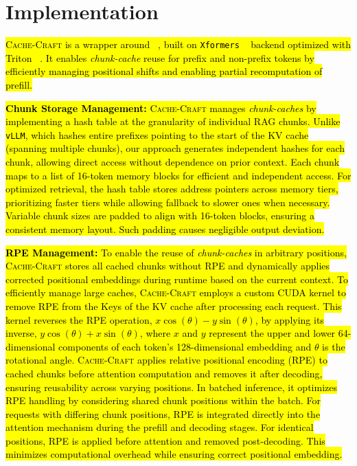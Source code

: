 \section{Implementation}
\label{sec:impl}

\noindent\hl{\textsc{Cache-Craft} is a wrapper around \vllm ~\cite{kwon2023efficient}, built on \texttt{Xformers} ~\cite{xFormers2022} backend optimized with Triton ~\cite{Triton2021}. It enables \textit{chunk-cache} reuse for prefix and non-prefix tokens by efficiently managing positional shifts and enabling partial recomputation of prefill.}


\noindent \hl{\textbf{Chunk Storage Management:} \textsc{Cache-Craft} manages \textit{chunk-caches} by implementing a hash table at the granularity of individual RAG chunks. Unlike \texttt{vLLM}, which hashes entire prefixes pointing to the start of the KV cache (spanning multiple chunks), our approach generates independent hashes for each chunk, allowing direct access without dependence on prior context. Each chunk maps to a list of 16-token memory blocks for efficient and independent access. For optimized retrieval, the hash table stores address pointers across memory tiers, prioritizing faster tiers while allowing fallback to slower ones when necessary. Variable chunk sizes are padded to align with 16-token blocks, ensuring a consistent memory layout. Such padding causes negligible output deviation.}


\noindent \hl{\textbf{RPE Management:} To enable the reuse of \textit{chunk-caches} in arbitrary positions, \textsc{Cache-Craft} stores all cached chunks without RPE and dynamically applies corrected positional embeddings during runtime based on the current context. To efficiently manage large caches, \textsc{Cache-Craft} employs a custom CUDA kernel to remove RPE from the Keys of the KV cache after processing each request. This kernel reverses the RPE operation, \( x \cos(\theta) - y \sin(\theta) \), by applying its inverse, \( y \cos(\theta) + x \sin(\theta) \), where \( x \) and \( y \) represent the upper and lower 64-dimensional components of each token's 128-dimensional embedding and $\theta$ is the rotational angle. 
\textsc{Cache-Craft} applies relative positional encoding (RPE) to cached chunks before attention computation and removes it after decoding, ensuring reusability across varying positions. In batched inference, it optimizes RPE handling by considering shared chunk positions within the batch. For requests with differing chunk positions, RPE is integrated directly into the attention mechanism during the prefill and decoding stages. For identical positions, RPE is applied before attention and removed post-decoding. This minimizes computational overhead while ensuring correct positional embedding.}





